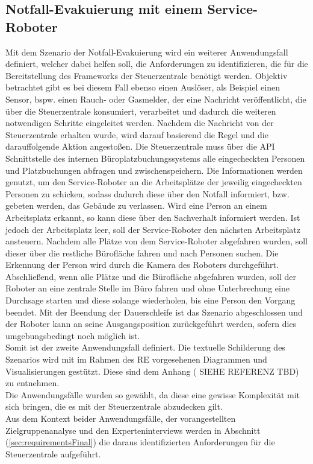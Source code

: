 \subsection{Notfall-Evakuierung mit einem Service-Roboter}
    Mit dem Szenario der Notfall-Evakuierung wird ein weiterer Anwendungsfall definiert, welcher dabei helfen soll, die 
    Anforderungen zu identifizieren, die für die Bereitstellung des Frameworks der Steuerzentrale benötigt werden.
    Objektiv betrachtet gibt es bei diesem Fall ebenso einen Auslöser, als Beispiel einen Sensor, bspw. einen Rauch- 
    oder Gasmelder, der eine Nachricht veröffentlicht, die über die Steuerzentrale konsumiert, verarbeitet und dadurch die 
    weiteren notwendigen Schritte eingeleitet werden. Nachdem die Nachricht von der Steuerzentrale erhalten wurde, wird 
    darauf basierend die Regel und die darauffolgende Aktion angestoßen. Die Steuerzentrale muss über die \acs{API} 
    Schnittstelle des internen Büroplatzbuchungssystems alle eingecheckten Personen und Platzbuchungen abfragen und 
    zwischenspeichern. Die Informationen werden genutzt, um den Service-Roboter an die Arbeitsplätze der jeweilig 
    eingecheckten Personen zu schicken, sodass dadurch diese über den Notfall informiert, bzw. gebeten werden, das 
    Gebäude zu verlassen. Wird eine Person an einem Arbeitsplatz erkannt, so kann diese über den Sachverhalt informiert 
    werden. Ist jedoch der Arbeitsplatz leer, soll der Service-Roboter den nächsten Arbeitsplatz ansteuern. Nachdem alle 
    Plätze von dem Service-Roboter abgefahren wurden, soll dieser über die restliche Bürofläche fahren und nach Personen 
    suchen. Die Erkennung der Person wird durch die Kamera des Roboters durchgeführt. Abschließend, wenn alle Plätze und die 
    Bürofläche abgefahren wurden, soll der Roboter an eine zentrale Stelle im Büro fahren und ohne Unterbrechung eine 
    Durchsage starten und diese solange wiederholen, bis eine Person den Vorgang beendet. Mit der Beendung der Dauerschleife 
    ist das Szenario abgeschlossen und der Roboter kann an seine Ausgangsposition zurückgeführt werden, sofern dies 
    umgebungsbedingt noch möglich ist.
    \\
    Somit ist der zweite Anwendungsfall definiert. Die textuelle Schilderung des Szenarios wird mit im Rahmen des \acs{RE} 
    vorgesehenen Diagrammen und Visualisierungen gestützt. Diese sind dem Anhang (%
    SIEHE REFERENZ TBD) zu entnehmen.
    \\
    \linebreak
    Die Anwendungsfälle wurden so gewählt, da diese eine gewisse Komplexität mit sich bringen, die es mit der Steuerzentrale 
    abzudecken gilt.
    \\
    Aus dem Kontext beider Anwendungsfälle, der vorangestellten Zielgruppenanalyse und den Experteninterviews werden in Abschnitt 
    (\ref{sec:requirementsFinal}) die daraus identifizierten Anforderungen für die Steuerzentrale aufgeführt.

